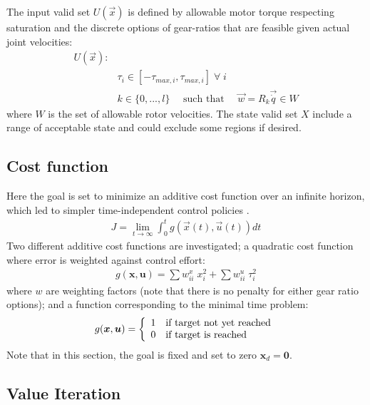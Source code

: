 The input valid set $U(\vec{x})$ is defined by allowable motor torque respecting saturation and the discrete options of gear-ratios that are feasible given actual joint velocities:
\begin{align}
	U(\vec{x}):&\\
	&\tau_i \in [ -\tau_{max,i} , \tau_{max,i} ] \;\forall\; i\\
	&k      \in \{ 0 , ... , l \} \quad\text{ such that }\quad \vec{w} = R_k \vec{\dot{q}} \in W
\end{align}
where $W$ is the set of allowable rotor velocities. The state valid set $X$ include a range of acceptable state and could exclude some regions if desired. 

\subsection{Cost function}
\label{sec:CostFunction}

Here the goal is set to minimize an additive cost function over an infinite horizon, which led to simpler time-independent control policies \cite{bertsekas_dynamic_2000}.
%
\begin{align}
	J = \lim_{ t \rightarrow \infty} \int_0^t g(\vec{x}(t),\vec{u}(t)) dt 
	\label{eq:j_lim}
\end{align}
%
Two different additive cost functions are investigated; a quadratic cost function where error is weighted against control effort:
%
\begin{align}
	g(\boldsymbol{x},\boldsymbol{u}) = \sum w^x_{ii} \; x_i^2 + \sum w^u_{ii} \; \tau_i^2
	\label{eq:g_quad}
\end{align}
%
where $w$ are weighting factors (note that there is no penalty for either gear ratio options); and a function corresponding to the minimal time problem:
%
\begin{align}
	g(\boldsymbol{x},\boldsymbol{u}) = \left \{ \begin{array}[pos]{l}	1 \quad   \text{if target not yet reached} \\ 0 \quad   \text{if target is reached} \end{array}  \right.
	\label{eq:g_time}
\end{align}
%
Note that in this section, the goal is fixed and set to zero $\boldsymbol{x}_d=\boldsymbol{0}$.


\subsection{Value Iteration}
\label{sec:VI}

